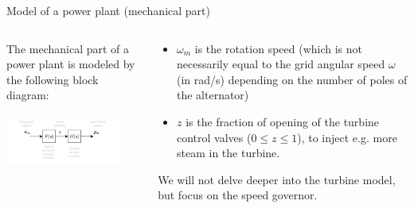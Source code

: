 \begin{frame}{Model of a power plant (mechanical part)}
  \begin{columns}
    \begin{column}{0.48\textwidth}
      The mechanical part of a power plant is modeled by the following block diagram:
      \begin{center}
        \includegraphics[width=0.85\textwidth]{images/governor_and_turbine_transfer_function.pdf}    
      \end{center}
    \end{column}
    \begin{column}{0.48\textwidth}
      \begin{itemize}
        \item $\omega_{m}$ is the rotation speed (which is not necessarily equal to the grid angular speed $\omega$ (in rad/s) depending on the number of poles of the alternator)
        \item $z$ is the fraction of opening of the turbine control valves ($0\le z\le1$), to inject e.g. more steam in the turbine.
      \end{itemize}
      We will not delve deeper into the turbine model, but focus on the speed governor.
    \end{column}
  \end{columns}
\end{frame}

